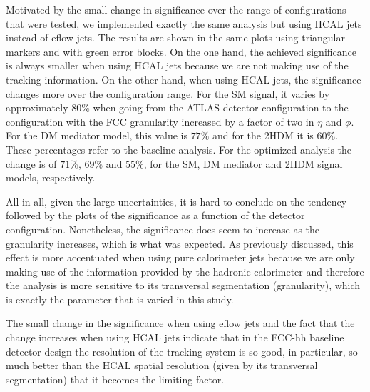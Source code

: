Motivated by the small change in significance over the range of configurations that were tested, we implemented exactly the same analysis but using HCAL jets instead of eflow jets. The results are shown in the same plots using triangular markers and with green error blocks. On the one hand, the achieved significance is always smaller when using HCAL jets because we are not making use of the tracking information. On the other hand, when using HCAL jets, the significance changes more over the configuration range. For the SM signal, it varies by approximately $80\%$ when going from the ATLAS detector configuration to the configuration with the FCC granularity increased by a factor of two in $\eta$ and $\phi$. For the DM mediator model, this value is $77\%$ and for the 2HDM it is $60\%$. These percentages refer to the baseline analysis. For the optimized analysis the change is of $71\%$, $69\%$ and $55\%$, for the SM, DM mediator and 2HDM signal models, respectively.

All in all, given the large uncertainties, it is hard to conclude on the tendency followed by the plots of the significance as a function of the detector configuration. Nonetheless, the significance does seem to increase as the granularity increases, which is what was expected. As previously discussed, this effect is more accentuated when using pure calorimeter jets because we are only making use of the information provided by the hadronic calorimeter and therefore the analysis is more sensitive to its transversal segmentation (granularity), which is exactly the parameter that is varied in this study.

The small change in the significance when using eflow jets and the fact that the change increases when using HCAL jets indicate that in the FCC-hh baseline detector design the resolution of the tracking system is so good, in particular, so much better than the HCAL spatial resolution (given by its transversal segmentation) that it becomes the limiting factor.

